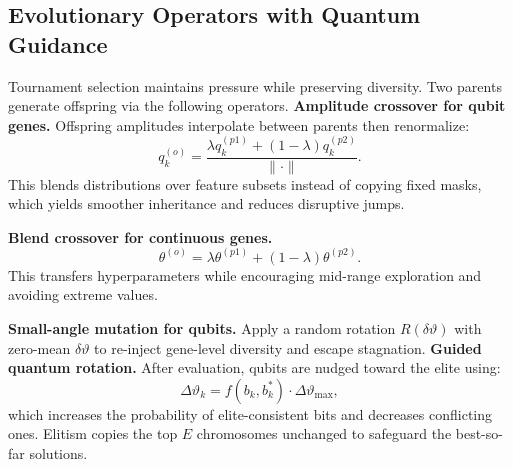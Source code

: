 \documentclass[11pt,a4paper]{article}
\begin{document}
\subsection{Evolutionary Operators with Quantum Guidance}
Tournament selection maintains pressure while preserving diversity. Two parents generate offspring via the following operators. \textbf{Amplitude crossover for qubit genes.} Offspring amplitudes interpolate between parents then renormalize:
\[
q_k^{(o)} = \frac{\lambda q_k^{(p1)} + (1-\lambda) q_k^{(p2)}}{\| \cdot \|}.
\]
This blends distributions over feature subsets instead of copying fixed masks, which yields smoother inheritance and reduces disruptive jumps.

\textbf{Blend crossover for continuous genes.}
\[
\theta^{(o)} = \lambda \theta^{(p1)} + (1-\lambda) \theta^{(p2)}.
\]
This transfers hyperparameters while encouraging mid-range exploration and avoiding extreme values.

\textbf{Small-angle mutation for qubits.} Apply a random rotation $R(\delta \vartheta)$ with zero-mean $\delta \vartheta$ to re-inject gene-level diversity and escape stagnation. \textbf{Guided quantum rotation.} After evaluation, qubits are nudged toward the elite using:
\[
\Delta \vartheta_k = f(b_k, b_k^*) \cdot \Delta \vartheta_\text{max},
\]
which increases the probability of elite-consistent bits and decreases conflicting ones. Elitism copies the top $E$ chromosomes unchanged to safeguard the best-so-far solutions.
\end{document}
